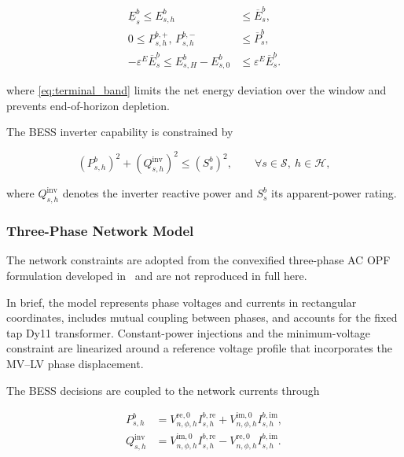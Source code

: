 \documentclass[journal]{IEEEtran}
\begin{document}
\begin{subequations}
\label{eq:battery_limits}
\begin{align}
\underline{E}^{b}_{s}
\leq E^{b}_{s,h}
&\leq
\overline{E}^{b}_{s},
\label{eq:energy_limits}
\\
0
\leq P^{b,+}_{s,h},\,P^{b,-}_{s,h}
&\leq
\overline{P}^{b}_{s},
\label{eq:power_limits}
\\
-\varepsilon^{E}\overline{E}^{b}_{s}
\leq E^{b}_{s,H}-E^{b}_{s,0}
&\leq
\varepsilon^{E}\overline{E}^{b}_{s}.
\label{eq:terminal_band}
\end{align}
\end{subequations}

where \eqref{eq:terminal_band} limits the net energy deviation over the window and prevents end-of-horizon depletion.

The BESS inverter capability is constrained by

\begin{equation}
\label{eq:scircle}
\left(P^{b}_{s,h}\right)^2
+
\left(Q^{\mathrm{inv}}_{s,h}\right)^2
\leq
\left(S^{b}_{s}\right)^2,
\qquad
\forall s\in\mathcal{S},\ h\in\mathcal{H},
\end{equation}

where \(Q^{\mathrm{inv}}_{s,h}\) denotes the inverter reactive power and \(S^{b}_{s}\) its apparent-power rating. 

\subsubsection{Three-Phase Network Model}
\label{ssec:three_phase_network}

The network constraints are adopted from the convexified three-phase AC OPF formulation developed in~\cite{gutierrez2021,gutierrez2019} and are not reproduced in full here. 

In brief, the model represents phase voltages and currents in rectangular coordinates, includes mutual coupling between phases, and accounts for the fixed tap Dy11 transformer. Constant-power injections and the minimum-voltage constraint are linearized around a reference voltage profile that incorporates the MV--LV phase displacement.

The BESS decisions are coupled to the network currents through

\begin{subequations}
\label{eq:battery_current_power}
\begin{align}
P^{b}_{s,h}
&=
V^{\mathrm{re},0}_{n,\phi,h}I^{b,\mathrm{re}}_{s,h}
+
V^{\mathrm{im},0}_{n,\phi,h}I^{b,\mathrm{im}}_{s,h},
\label{eq:pbatt}
\\
Q^{\mathrm{inv}}_{s,h}
&=
V^{\mathrm{im},0}_{n,\phi,h}I^{b,\mathrm{re}}_{s,h}
-
V^{\mathrm{re},0}_{n,\phi,h}I^{b,\mathrm{im}}_{s,h}.
\label{eq:qbatt}
\end{align}
\end{subequations}
\end{document}
